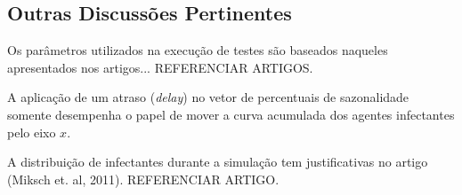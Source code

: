 \subsection{Outras Discussões Pertinentes}

Os parâmetros utilizados na execução de testes são baseados naqueles apresentados nos artigos... {\color{red} REFERENCIAR ARTIGOS. }

A aplicação de um atraso (\textit{delay}) no vetor de percentuais de sazonalidade somente desempenha o papel de mover a curva acumulada dos agentes infectantes pelo eixo $x$. 

A distribuição de infectantes durante a simulação tem justificativas no artigo (Miksch et. al, 2011). {\color{red} REFERENCIAR ARTIGO. }

\newpage
